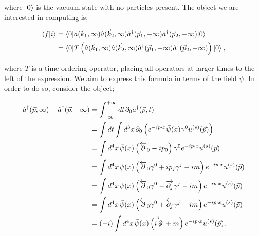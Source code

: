 where $\mathinner{\lvert0\rangle}_{\hspace{-0.1em}}$ is the vacuum state with no particles present. The object we are interested in computing is;

\begin{equation}
\begin{split}
\left< f | i \right> &= \mathinner{\langle0\vert\hat{a}(\vec{k}_1,\infty) \hat{a}(\vec{k}_2 ,\infty) \hat{a}^\dagger(\vec{p}_1,-\infty) \hat{a}^\dagger(\vec{p}_2 ,-\infty)\vert0\rangle}_{} \\
& = \mathinner{\langle0\vert T \left(\hat{a}(\vec{k}_1,\infty) \hat{a}(\vec{k}_2 ,\infty) \hat{a}^\dagger(\vec{p}_1,-\infty) \hat{a}^\dagger(\vec{p}_2 ,-\infty) \right)\vert0\rangle}_{},
\end{split}
\end{equation}

where $T$ is a time-ordering operator, placing all operators at larger times to the left of the expression. We aim to express this formula in terms of the field $\psi$. In order to do so, consider the object;

\begin{equation}
\begin{split}
\hat{a}^\dagger(\vec{p},\infty) - \hat{a}^\dagger(\vec{p},-\infty) &= \int_{- \infty}^{+ \infty} dt \hspace{1pt} \partial_0 a^\dagger(\vec{p},t) \\
&=  \int dt \int d^3 x \hspace{1pt} \partial_0 \left( e^{- i p \cdot x} \bar{\psi}(x) \gamma^0 u^{(s)}(\vec{p}) \right) \\
&= \int d^4 x \hspace{1pt} \bar{\psi}(x) \left(\overleftarrow{\partial}_0 - i p_0 \right) \gamma^0 e^{- i p \cdot x} u^{(s)}(\vec{p}) \\
&=  \int d^4 x \hspace{1pt} \bar{\psi}(x) \left(\overleftarrow{\partial}_0 \gamma^0 + i p_j \gamma^j - im \right) e^{- i p \cdot x} u^{(s)}(\vec{p}) \\
&=  \int d^4 x \hspace{1pt} \bar{\psi}(x) \left(\overleftarrow{\partial}_0 \gamma^0 - \overrightarrow{\partial_j} \gamma^j - im \right) e^{- i p \cdot x} u^{(s)}(\vec{p}) \\
&=  \int d^4 x \hspace{1pt} \bar{\psi}(x) \left(\overleftarrow{\partial}_0 \gamma^0 + \overleftarrow{\partial_j} \gamma^j - im \right) e^{- i p \cdot x} u^{(s)}(\vec{p}) \\
&=  (-i) \int d^4 x \hspace{1pt} \bar{\psi}(x) \left(i \overleftarrow{\slashed{\partial}} + m \right) e^{- i p \cdot x} u^{(s)}(\vec{p}),
\end{split}
\end{equation}

